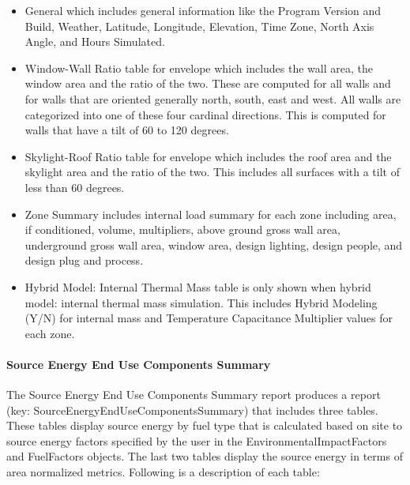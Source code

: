 \begin{itemize}
\item
  General which includes general information like the Program Version and Build, Weather, Latitude, Longitude, Elevation, Time Zone, North Axis Angle, and Hours Simulated.
\item
  Window-Wall Ratio table for envelope which includes the wall area, the window area and the ratio of the two. These are computed for all walls and for walls that are oriented generally north, south, east and west. All walls are categorized into one of these four cardinal directions. This is computed for walls that have a tilt of 60 to 120 degrees.
\item
  Skylight-Roof Ratio table for envelope which includes the roof area and the skylight area and the ratio of the two. This includes all surfaces with a tilt of less than 60 degrees.
\item
  Zone Summary includes internal load summary for each zone including area, if conditioned, volume, multipliers, above ground gross wall area, underground gross wall area, window area, design lighting, design people, and design plug and process. 
\item
  Hybrid Model: Internal Thermal Mass table is only shown when hybrid model: internal thermal mass simulation. This includes Hybrid Modeling (Y/N) for internal mass and Temperature Capacitance Multiplier values for each zone.
\end{itemize}

\paragraph{Source Energy End Use Components Summary}\label{source-energy-end-use-components-summary}

The Source Energy End Use Components Summary report produces a report (key: SourceEnergyEndUseComponentsSummary) that includes three tables. These tables display source energy by fuel type that is calculated based on site to source energy factors specified by the user in the EnvironmentalImpactFactors and FuelFactors objects. The last two tables display the source energy in terms of area normalized metrics. Following is a description of each table:

